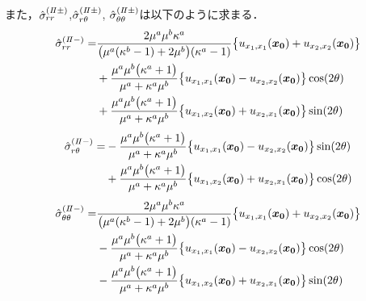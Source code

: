 また，$\hat{\sigma}_{rr}^{(I\hspace{-.15em}I\pm)}$,$\hat{\sigma}_{r\theta}^{(I\hspace{-.15em}I\pm)}$,
$\hat{\sigma}_{\theta\theta}^{(I\hspace{-.15em}I\pm)}$は以下のように求まる．
\begin{align}
	\hat{\sigma}_{rr}^{(I\hspace{-.15em}I-)} =
	&\frac{2\mu^{a}\mu^{b}\kappa^{a}}{\bigl(\mu^{a}(\kappa^{b}-1)+2\mu^{b}\bigr)(\kappa^{a}-1)}
	\bigl\{u_{x_{1},x_{1}}(\bm{x_{0}})+u_{x_{2},x_{2}}(\bm{x_{0}})\bigr\}
	\nonumber
	\\
	&+\frac{\mu^{a}\mu^{b}\bigl(\kappa^{a}+1\bigr)}{\mu^{a}+\kappa^{a}\mu^{b}}
	\bigl\{u_{x_{1},x_{1}}(\bm{x_{0}})-u_{x_{2},x_{2}}(\bm{x_{0}})\bigr\}\cos(2\theta)
	\nonumber
	\\
	&+\frac{\mu^{a}\mu^{b}\bigl(\kappa^{a}+1\bigr)}{\mu^{a}+\kappa^{a}\mu^{b}}
	\bigl\{u_{x_{1},x_{2}}(\bm{x_{0}})+u_{x_{2},x_{1}}(\bm{x_{0}})\bigr\}\sin(2\theta)
	\label{eq:SigmaRRIn2Sol}
\end{align}
\begin{align}
	\hat{\sigma}_{r\theta}^{(I\hspace{-.15em}I-)} =
	&-\frac{\mu^{a}\mu^{b}\bigl(\kappa^{a}+1\bigr)}{\mu^{a}+\kappa^{a}\mu^{b}}
	\bigl\{u_{x_{1},x_{1}}(\bm{x_{0}})-u_{x_{2},x_{2}}(\bm{x_{0}})\bigr\}\sin(2\theta)
	\nonumber
	\\
	&+\frac{\mu^{a}\mu^{b}\bigl(\kappa^{a}+1\bigr)}{\mu^{a}+\kappa^{a}\mu^{b}}
	\bigl\{u_{x_{1},x_{2}}(\bm{x_{0}})+u_{x_{2},x_{1}}(\bm{x_{0}})\bigr\}\cos(2\theta)
	\label{eq:SigmaRThIn2Sol}
\end{align}
\begin{align}
	\hat{\sigma}_{\theta\theta}^{(I\hspace{-.15em}I-)} =
	&\frac{2\mu^{a}\mu^{b}\kappa^{a}}{\bigl(\mu^{a}(\kappa^{b}-1)+2\mu^{b}\bigr)(\kappa^{a}-1)}
	\bigl\{u_{x_{1},x_{1}}(\bm{x_{0}})+u_{x_{2},x_{2}}(\bm{x_{0}})\bigr\}
	\nonumber
	\\
	&-\frac{\mu^{a}\mu^{b}\bigl(\kappa^{a}+1\bigr)}{\mu^{a}+\kappa^{a}\mu^{b}}
	\bigl\{u_{x_{1},x_{1}}(\bm{x_{0}})-u_{x_{2},x_{2}}(\bm{x_{0}})\bigr\}\cos(2\theta)
	\nonumber
	\\
	&-\frac{\mu^{a}\mu^{b}\bigl(\kappa^{a}+1\bigr)}{\mu^{a}+\kappa^{a}\mu^{b}}
	\bigl\{u_{x_{1},x_{2}}(\bm{x_{0}})+u_{x_{2},x_{1}}(\bm{x_{0}})\bigr\}\sin(2\theta)
	\label{eq:SigmaThThIn2Sol}
\end{align}

